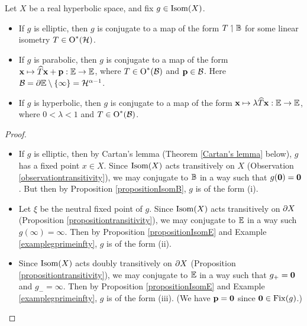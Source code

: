 \begin{proposition}\label{class}
Let $X$ be a real hyperbolic space, and fix $g\in\operatorname{Isom}(X)$.
\begin{itemize}
\item[(i)] If $g$ is elliptic, then $g$ is conjugate to a map of the form $T \given \B$ for some linear isometry $T\in\operatorname{O}^*(\mathcal H)$.
\item[(ii)] If $g$ is parabolic, then $g$ is conjugate to a map of the form $\xx\mapsto \what T \xx + \pp:\E\to\E$, where $T\in\operatorname{O}^*(\mathcal B)$ and $\mathbf p\in\mathcal B$. Here $\BB = \del\E\butnot\{\infty\} = \HH^{\alpha - 1}$.
\item[(iii)] If $g$ is hyperbolic, then $g$ is conjugate to a map of the form $\xx\mapsto \lambda \what T \xx: \E \to \E$, where $0< \lambda < 1$ and $T\in\operatorname{O}^*(\mathcal B)$.
\end{itemize}
\end{proposition}
\begin{proof}~
\begin{itemize}
\item[(i)] If $g$ is elliptic, then by Cartan's lemma (Theorem \ref{Cartan's lemma} below), $g$ has a fixed point $x\in X$. Since $\operatorname{Isom}(X)$ acts transitively on $X$ (Observation \ref{observationtransitivity}), we may conjugate to $\B$ in a way such that $g(\mathbf 0) = \mathbf 0$. But then by Proposition \ref{propositionIsomB}, $g$ is of the form (i).
\item[(ii)] Let $\xi$ be the neutral fixed point of $g$. Since $\operatorname{Isom}(X)$ acts transitively on $\partial X$ (Proposition \ref{propositiontransitivity}), we may conjugate to $\E$ in a way such $g(\infty) = \infty$. Then by Proposition \ref{propositionIsomE} and Example \ref{examplegprimeinfty}, $g$ is of the form (ii).
\item[(iii)] Since $\operatorname{Isom}(X)$ acts doubly transitively on $\partial X$ (Proposition \ref{propositiontransitivity}), we may conjugate to $\E$ in a way such that $g_+ = \mathbf 0$ and $g_- = \infty$. Then by Proposition \ref{propositionIsomE} and Example \ref{examplegprimeinfty}, $g$ is of the form (iii). (We have $\mathbf p = \mathbf 0$ since $\mathbf 0\in\operatorname{Fix}(g)$.)
\end{itemize}
\end{proof}


